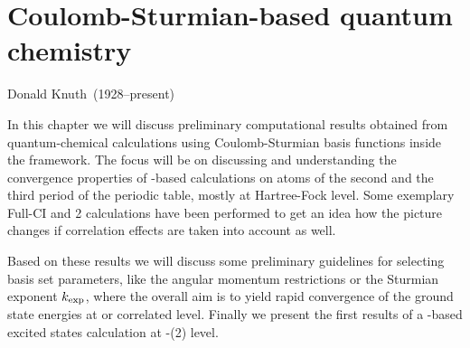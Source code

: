 \chapter{Coulomb-Sturmian-based quantum chemistry}
\label{ch:CSQChem}
{Donald Knuth~(1928--present)}

\noindent
In this chapter we will discuss preliminary computational results
obtained from quantum-chemical calculations using Coulomb-Sturmian
basis functions inside the \linebreak \molsturm framework.
The focus will be on discussing and understanding the convergence
properties of \CS-based calculations on atoms of
the second and the third period of the periodic table,
mostly at Hartree-Fock level.
Some exemplary Full-CI and {\MP}2 calculations have been performed
to get an idea how the picture changes
if correlation effects are taken into account as well.

Based on these results we will discuss some
preliminary guidelines for selecting \CS basis set parameters,
like the angular momentum restrictions or the Sturmian exponent $k_\text{exp}$,
where the overall aim is to yield rapid convergence
of the ground state energies at \HF or correlated level.
Finally we present the first results of a \CS-based
excited states calculation at \ADC-(2) level.





% 
% 

